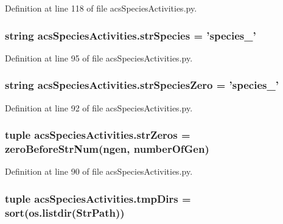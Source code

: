 Definition at line 118 of file acs\-Species\-Activities.\-py.

\hypertarget{a00103_a7ad6c119fecb41b02823a95f334daa4c}{
\subsubsection[{str\-Species}]{\setlength{\rightskip}{0pt plus 5cm}string acs\-Species\-Activities.\-str\-Species = 'species\-\_\-'}}\label{a00103_a7ad6c119fecb41b02823a95f334daa4c}


Definition at line 95 of file acs\-Species\-Activities.\-py.

\hypertarget{a00103_a78927c369e0fe9deb29777c699af346f}{
\subsubsection[{str\-Species\-Zero}]{\setlength{\rightskip}{0pt plus 5cm}string acs\-Species\-Activities.\-str\-Species\-Zero = 'species\-\_\-'}}\label{a00103_a78927c369e0fe9deb29777c699af346f}


Definition at line 92 of file acs\-Species\-Activities.\-py.

\hypertarget{a00103_ac53f52471f3cf1ef18465a07dc930dff}{
\subsubsection[{str\-Zeros}]{\setlength{\rightskip}{0pt plus 5cm}tuple acs\-Species\-Activities.\-str\-Zeros = {\bf zero\-Before\-Str\-Num}(ngen, {\bf number\-Of\-Gen})}}\label{a00103_ac53f52471f3cf1ef18465a07dc930dff}


Definition at line 90 of file acs\-Species\-Activities.\-py.

\hypertarget{a00103_addf4c61c6afe70a2ea39931695ddc36b}{
\subsubsection[{tmp\-Dirs}]{\setlength{\rightskip}{0pt plus 5cm}tuple acs\-Species\-Activities.\-tmp\-Dirs = sort(os.\-listdir({\bf Str\-Path}))}}\label{a00103_addf4c61c6afe70a2ea39931695ddc36b}


